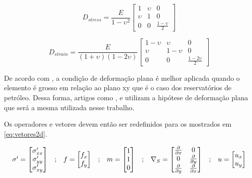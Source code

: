 \begin{equation} \label{eq:elasticplanestress}
D_{stress} = \frac{E}{1-\upsilon^2}
\begin{bmatrix}
1  & \upsilon & 0 \\ 
\upsilon & 1 &  0 \\ 
0 & 0 & \frac{1-\upsilon}{2}
\end{bmatrix}
\end{equation}

\begin{equation} \label{eq:elasticplanestrain}
D_{strain} = \frac{E}{(1+\upsilon)(1-2\upsilon)}
\begin{bmatrix}
 1-\upsilon & \upsilon    &  0 \\ 
 \upsilon   &  1-\upsilon &  0 \\ 
 0& 0 & \frac{1-2\upsilon}{2}
\end{bmatrix}
\end{equation}

De acordo com \cite{jacob}, a condição de deformação plana é melhor aplicada quando o elemento é grosso em relação ao plano xy que é o caso dos reservatórios de petróleo.  Dessa forma, artigos como \cite{planeStrainProblems}, \cite{casteletto} e \cite{irina} utilizam a hipótese de deformação plana que será a mesma utilizada nesse trabalho.

Os operadores e vetores devem então ser redefinidos para os mostrados em \eqref{eq:vetores2d}.

\begin{equation}
\label{eq:vetores2d}
\begin{matrix}
\sigma^\prime = \begin{bmatrix}
\sigma^\prime_{xx}
\\
\sigma^\prime_{yy}
\\
\sigma^\prime_{xy}
\end{bmatrix}
&

;

&

f = \begin{bmatrix}
f_{x}
\\
f_{y}
\end{bmatrix}
&
;
&

m = \begin{bmatrix} 1 \\ 1 \\ 0\end{bmatrix}

&
;

&
\nabla_S = \begin{bmatrix} \frac{\partial { }}{\partial x} & 0 \\ 0 & \frac{\partial { }}{\partial y} \\ \frac{\partial { }}{\partial y} & \frac{\partial { }}{\partial x} \\ \end{bmatrix}

&
;

&

u = \begin{bmatrix}
u_x
\\ 
u_y
\end{bmatrix}

\end{matrix}
\end{equation}

